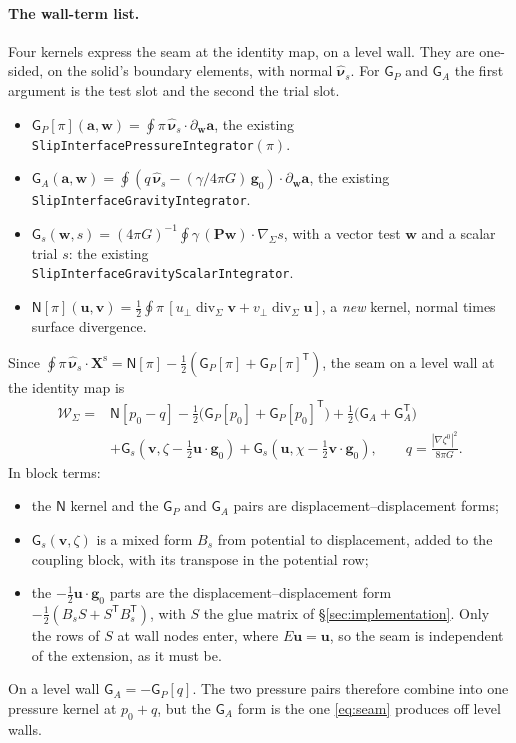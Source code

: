 \documentclass[11pt]{article}
\theoremstyle{definition}
\theoremstyle{remark}
\newcommand{\bu}{\mathbf{u}}
\newcommand{\bv}{\mathbf{v}}
\newcommand{\bw}{\mathbf{w}}
\newcommand{\Div}{\operatorname{div}}
\newcommand{\code}[1]{\texttt{#1}}
\newcommand{\nuhs}{\hat{\boldsymbol{\nu}}_s}
\begin{document}
\paragraph{The wall-term list.} Four kernels express the seam at the
identity map, on a level wall. They are one-sided, on the solid's
boundary elements, with normal $\nuhs$. For $\mathsf G_P$ and
$\mathsf G_A$ the first argument is the test slot and the second the
trial slot.
\begin{itemize}
\item $\mathsf G_P[\pi](\mathbf a, \bw) = \oint\pi\,\nuhs\cdot\partial_{\bw}\mathbf a$, the existing
  \code{SlipInterfacePressureIntegrator}$(\pi)$.
\item $\mathsf G_A(\mathbf a, \bw) = \oint(q\,\nuhs - (\gamma/4\pi
  G)\,\mathbf g_0)\cdot\partial_{\bw}\mathbf a$, the existing
  \code{SlipInterfaceGravityIntegrator}.
\item $\mathsf G_s(\bw, s) = (4\pi G)^{-1}\oint\gamma\,(\mathbf
  P\bw)\cdot\nabla_\Sigma s$, with a vector test $\bw$ and a scalar
  trial $s$: the existing\\ \code{SlipInterfaceGravityScalarIntegrator}.
\item $\mathsf N[\pi](\bu, \bv) = \tfrac12\oint\pi\,[u_\perp\Div_\Sigma
  \bv + v_\perp\Div_\Sigma\bu]$, a \emph{new} kernel, normal times surface
  divergence.
\end{itemize}
Since $\oint\pi\,\nuhs\cdot\mathbf X^{\mathrm s} = \mathsf N[\pi]
- \tfrac12(\mathsf G_P[\pi] + \mathsf G_P[\pi]^{\mathsf T})$, the seam
on a level wall at the identity map is
\begin{equation}
\begin{aligned}
  \mathcal W_\Sigma ={}& \mathsf N[p_0 - q]
  - \tfrac12\bigl(\mathsf G_P[p_0] + \mathsf G_P[p_0]^{\mathsf T}\bigr)
  + \tfrac12\bigl(\mathsf G_A + \mathsf G_A^{\mathsf T}\bigr) \\
  &+ \mathsf G_s(\bv, \zeta - \tfrac12\bu\cdot\mathbf g_0)
  + \mathsf G_s(\bu, \chi - \tfrac12\bv\cdot\mathbf g_0),
  \qquad q = \frac{|\nabla\zeta^0|^2}{8\pi G} .
\end{aligned}
  \label{eq:seam-kernels}
\end{equation}
In block terms:
\begin{itemize}
\item the $\mathsf N$ kernel and the $\mathsf G_P$ and $\mathsf G_A$
  pairs are displacement--displacement forms;
\item $\mathsf G_s(\bv, \zeta)$ is a mixed form $B_s$ from potential to
  displacement, added to the coupling block, with its transpose in the
  potential row;
\item the $-\tfrac12\bu\cdot\mathbf g_0$ parts are the
  displacement--displacement form $-\tfrac12(B_sS + S^{\mathsf
  T}B_s^{\mathsf T})$, with $S$ the glue matrix of
  \S\ref{sec:implementation}. Only the rows of $S$ at wall nodes enter,
  where $E\bu = \bu$, so the seam is independent of the extension, as
  it must be.
\end{itemize}
On a level wall $\mathsf G_A = -\mathsf G_P[q]$. The two pressure
pairs therefore combine into one pressure kernel at $p_0 + q$, but the
$\mathsf G_A$ form is the one \eqref{eq:seam} produces off level walls.
\end{document}
